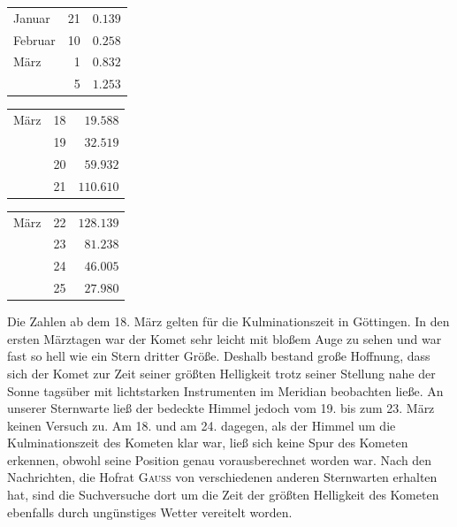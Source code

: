 \begin{center}
\begin{tabular}{lr|r}
Januar & 21 & $0.139$ \\
Februar & 10 & $0.258$ \\
März & 1 & $0.832$ \\
& 5 & $1.253$ \\
\end{tabular}
\end{center}
\begin{center}
\begin{tabular}{lr|r}
März & 18 & $19.588$ \\
& 19 & $32.519$ \\
& 20 & $59.932$ \\
& 21 & $110.610$ \\
\end{tabular}
\end{center}
\begin{center}
\begin{tabular}{lr|r}
März & 22 & $128.139$ \\
& 23 & $81.238$ \\
& 24 & $46.005$ \\
& 25 & $27.980$ \\
\end{tabular}
\end{center}

Die Zahlen ab dem 18. März gelten für die Kulminationszeit in Göttingen. In den ersten Märztagen war der Komet sehr leicht mit bloßem Auge zu sehen und war fast so hell wie ein Stern dritter Größe. Deshalb bestand große Hoffnung, dass sich der Komet zur Zeit seiner größten Helligkeit trotz seiner Stellung nahe der Sonne tagsüber mit lichtstarken Instrumenten im Meridian beobachten ließe. An unserer Sternwarte ließ der bedeckte Himmel jedoch vom 19. bis zum 23. März keinen Versuch zu. Am 18. und am 24. dagegen, als der Himmel um die
%
Kulminationszeit des Kometen klar war, ließ sich keine Spur des Kometen erkennen, obwohl seine Position genau vorausberechnet worden war. Nach den Nachrichten, die Hofrat \textsc{Gauss} von verschiedenen anderen Sternwarten erhalten hat, sind die Suchversuche dort um die Zeit der größten Helligkeit des Kometen ebenfalls durch ungünstiges Wetter vereitelt worden.
